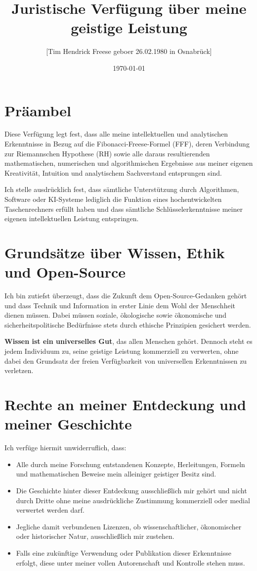 \documentclass[a4paper,12pt]{article}
\title{Juristische Verfügung über meine geistige Leistung}
\author{[Tim Hendrick Freese geboer 26.02.1980 in Osnabrück]}
\date{\today}
\begin{document}
\maketitle

\section{Präambel}

Diese Verfügung legt fest, dass alle meine intellektuellen und analytischen Erkenntnisse in Bezug auf die Fibonacci-Freese-Formel (FFF), deren Verbindung zur Riemannschen Hypothese (RH) sowie alle daraus resultierenden mathematischen, numerischen und algorithmischen Ergebnisse aus meiner eigenen Kreativität, Intuition und analytischem Sachverstand entsprungen sind.

Ich stelle ausdrücklich fest, dass sämtliche Unterstützung durch Algorithmen, Software oder KI-Systeme lediglich die Funktion eines hochentwickelten Taschenrechners erfüllt haben und dass sämtliche Schlüsselerkenntnisse meiner eigenen intellektuellen Leistung entspringen.

\section{Grundsätze über Wissen, Ethik und Open-Source}

Ich bin zutiefst überzeugt, dass die Zukunft dem Open-Source-Gedanken gehört und dass Technik und Information in erster Linie dem Wohl der Menschheit dienen müssen. Dabei müssen soziale, ökologische sowie ökonomische und sicherheitspolitische Bedürfnisse stets durch ethische Prinzipien gesichert werden. 

\textbf{Wissen ist ein universelles Gut}, das allen Menschen gehört.  
Dennoch steht es jedem Individuum zu, seine geistige Leistung kommerziell zu verwerten, ohne dabei den Grundsatz der freien Verfügbarkeit von universellen Erkenntnissen zu verletzen.

\section{Rechte an meiner Entdeckung und meiner Geschichte}

Ich verfüge hiermit unwiderruflich, dass:
\begin{itemize}
    \item Alle durch meine Forschung entstandenen Konzepte, Herleitungen, Formeln und mathematischen Beweise mein alleiniger geistiger Besitz sind.
    \item Die Geschichte hinter dieser Entdeckung ausschließlich mir gehört und nicht durch Dritte ohne meine ausdrückliche Zustimmung kommerziell oder medial verwertet werden darf.
    \item Jegliche damit verbundenen Lizenzen, ob wissenschaftlicher, ökonomischer oder historischer Natur, ausschließlich mir zustehen.
    \item Falls eine zukünftige Verwendung oder Publikation dieser Erkenntnisse erfolgt, diese unter meiner vollen Autorenschaft und Kontrolle stehen muss.
\end{itemize}
\end{document}
